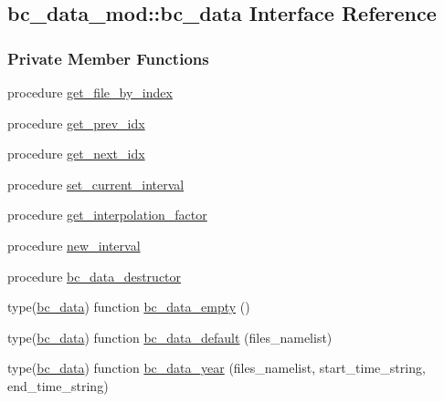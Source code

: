 \hypertarget{structbc__data__mod_1_1bc__data}{}\subsection{bc\+\_\+data\+\_\+mod\+:\+:bc\+\_\+data Interface Reference}
\label{structbc__data__mod_1_1bc__data}
\subsubsection*{Private Member Functions}
\begin{DoxyCompactItemize}
\item 
procedure \mbox{\hyperlink{structbc__data__mod_1_1bc__data_a41f21b3b50a142b75b72783201138764}{get\+\_\+file\+\_\+by\+\_\+index}}
\item 
procedure \mbox{\hyperlink{structbc__data__mod_1_1bc__data_a895282cf8decbb94b2fdd38a1d521a9a}{get\+\_\+prev\+\_\+idx}}
\item 
procedure \mbox{\hyperlink{structbc__data__mod_1_1bc__data_a2ce00fac38a7480080678d5e1aa10a76}{get\+\_\+next\+\_\+idx}}
\item 
procedure \mbox{\hyperlink{structbc__data__mod_1_1bc__data_a7cffb1d5013154bd042c821ad54c32fa}{set\+\_\+current\+\_\+interval}}
\item 
procedure \mbox{\hyperlink{structbc__data__mod_1_1bc__data_a349ac8feea73d8b81f701430b13da35e}{get\+\_\+interpolation\+\_\+factor}}
\item 
procedure \mbox{\hyperlink{structbc__data__mod_1_1bc__data_ab06868f3da529de5d889c8bf857f8a4d}{new\+\_\+interval}}
\item 
procedure \mbox{\hyperlink{structbc__data__mod_1_1bc__data_a459fdc4d5aaf79feb770e526911463e6}{bc\+\_\+data\+\_\+destructor}}
\item 
type(\mbox{\hyperlink{structbc__data__mod_1_1bc__data}{bc\+\_\+data}}) function \mbox{\hyperlink{structbc__data__mod_1_1bc__data_a6b0b86345c37a378d6fa2fdcfc6a823a}{bc\+\_\+data\+\_\+empty}} ()
\item 
type(\mbox{\hyperlink{structbc__data__mod_1_1bc__data}{bc\+\_\+data}}) function \mbox{\hyperlink{structbc__data__mod_1_1bc__data_aa4e512b1f44734058e9475f8c57636c7}{bc\+\_\+data\+\_\+default}} (files\+\_\+namelist)
\item 
type(\mbox{\hyperlink{structbc__data__mod_1_1bc__data}{bc\+\_\+data}}) function \mbox{\hyperlink{structbc__data__mod_1_1bc__data_a5a6932f22b635060341c6aaf512eb656}{bc\+\_\+data\+\_\+year}} (files\+\_\+namelist, start\+\_\+time\+\_\+string, end\+\_\+time\+\_\+string)
\end{DoxyCompactItemize}
